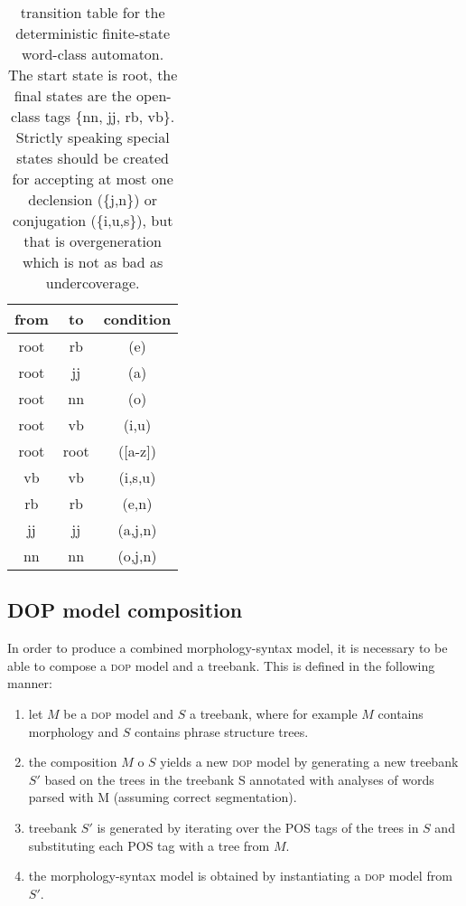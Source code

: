 \documentclass[10pt,a4paper]{article}
\begin{document}
\begin{table}
\begin{tabular}{ccc}
from & to & condition \\ \hline
root & rb & (e) \\
root & jj & (a) \\
root & nn & (o) \\
root & vb & ({i,u}) \\
root & root & ([a-z]) \\
vb & vb & ({i,s,u}) \\
rb & rb & ({e,n})  \\
jj & jj & ({a,j,n}) \\
nn & nn & ({o,j,n})
\end{tabular}
\caption{transition table for the deterministic finite-state word-class
automaton. The start state is root, the final states are the open-class tags
\{nn, jj, rb, vb\}. Strictly speaking special states should be created for
accepting at most one declension (\{j,n\}) or conjugation (\{i,u,s\}), but that
is overgeneration which is not as bad as undercoverage.}
\label{posfsa-tab}
\end{table}


\subsection{DOP model composition}

In order to produce a combined morphology-syntax model, it is necessary to be
able to compose a \textsc{dop} model and a treebank. This is defined in the following
manner:

\begin{enumerate}
\item let $M$ be a \textsc{dop} model and $S$ a treebank, where for example $M$ contains
      morphology and $S$ contains phrase structure trees.
\item the composition $M$ o $S$ yields a new \textsc{dop} model by generating a new
      treebank $S'$ based on the trees in the treebank S annotated with
      analyses of words parsed with M (assuming correct segmentation).
\item treebank $S'$ is generated by iterating over the POS tags of the trees in
      $S$ and substituting each POS tag with a tree from $M$.
\item the morphology-syntax model is obtained by instantiating a \textsc{dop} model from
      $S'$.
\end{enumerate}
\end{document}

